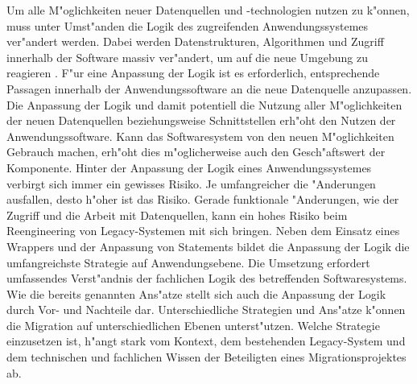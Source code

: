 Um alle M"oglichkeiten neuer Datenquellen und -technologien nutzen zu k"onnen, muss unter Umst"anden die Logik des zugreifenden Anwendungssystemes ver"andert werden. Dabei werden Datenstrukturen, Algorithmen und Zugriff innerhalb der Software massiv ver"andert, um auf die neue Umgebung zu reagieren \citep{henrard-2002}. F"ur eine Anpassung der Logik ist es erforderlich, entsprechende Passagen innerhalb der Anwendungssoftware an die neue Datenquelle anzupassen. 
%
%
%
\lb
Die Anpassung der Logik und damit potentiell die Nutzung aller M"oglichkeiten der neuen Datenquellen beziehungsweise Schnittstellen erh"oht den Nutzen der Anwendungssoftware. Kann das Softwaresystem von den neuen M"oglichkeiten Gebrauch machen, erh"oht dies m"oglicherweise auch den Gesch"aftswert der Komponente. 
\lb
Hinter der Anpassung der Logik eines Anwendungssystemes verbirgt sich immer ein gewisses Risiko. Je umfangreicher die "Anderungen ausfallen, desto h"oher ist das Risiko. Gerade funktionale "Anderungen, wie der Zugriff und die Arbeit mit Datenquellen, kann ein hohes Risiko beim Reengineering von Legacy-Systemen mit sich bringen.
\lb
Neben dem Einsatz eines Wrappers und der Anpassung von Statements bildet die Anpassung der Logik die umfangreichste Strategie auf Anwendungsebene. Die Umsetzung erfordert umfassendes Verst"andnis der fachlichen Logik des betreffenden Softwaresystems. Wie die bereits genannten Ans"atze stellt sich auch die Anpassung der Logik durch Vor- und Nachteile dar. Unterschiedliche Strategien und Ans"atze k"onnen die Migration auf unterschiedlichen Ebenen unterst"utzen. Welche Strategie einzusetzen ist, h"angt stark vom Kontext, dem bestehenden Legacy-System und dem technischen und fachlichen Wissen der Beteiligten eines Migrationsprojektes ab.
